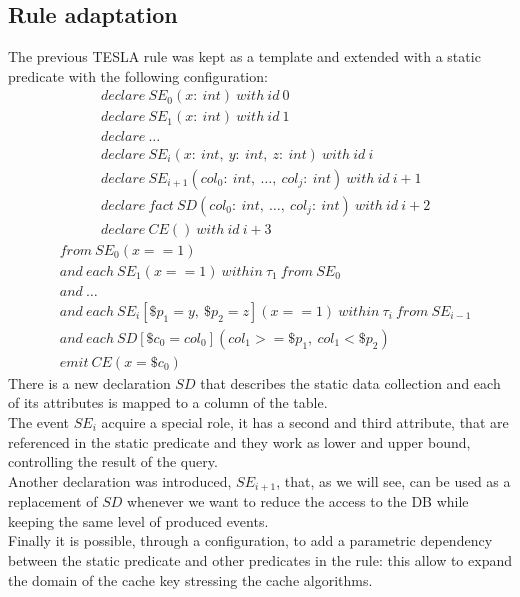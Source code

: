 \subsection{Rule adaptation}
The previous TESLA rule was kept as a template and extended with a static predicate with the following configuration:
\begin{align*}
&declare\ SE_0(x:\ int)\ with\ id\ 0\\
&declare\ SE_1(x:\ int)\ with\ id\ 1\\
&declare\ \ldots\\
&declare\ SE_i(x:\ int,\ y:\ int,\ z:\ int)\ with\ id\ i\\
&declare\ SE_{i+1}(col_0:\ int,\ \ldots,\ col_j:\ int)\ with\ id\ i+1\\
&declare\ fact\ SD(col_0:\ int,\ \ldots,\ col_j:\ int)\ with\ id\ i+2\\
&declare\ CE()\ with\ id\ i+3
\end{align*}
\begin{align*}
&from\ SE_0(x == 1)\\
&and\ each\ SE_1(x == 1)\ within\ \tau_1\ from\ SE_0\\
&and\ \ldots\\
&and\ each\ SE_i[\$p_1 = y,\ \$p_2 = z](x == 1)\ within\ \tau_i\ from\ SE_{i-1}\\
&and\ each\ SD[\$c_0 = col_0](col_1 >= \$p_1,\ col_1 < \$p_2)\\
&emit\ CE(x = \$c_0)
\end{align*}
There is a new declaration $SD$ that describes the static data collection and each of its attributes is mapped to a column of the table.\\
The event $SE_i$ acquire a special role, it has a second and third attribute, that are referenced in the static predicate and they work as lower and upper bound, controlling the result of the query.\\
Another declaration was introduced, $SE_{i+1}$, that, as we will see, can be used as a replacement of $SD$ whenever we want to reduce the access to the DB while keeping the same level of produced events.\\
Finally it is possible, through a configuration, to add a parametric dependency between the static predicate and other predicates in the rule: this allow to expand the domain of the cache key stressing the cache algorithms.

